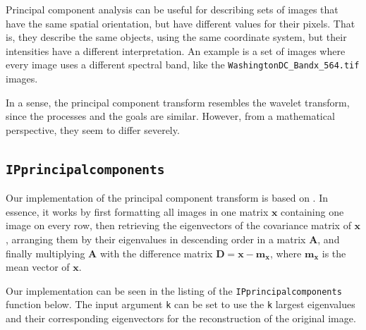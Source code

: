 Principal component analysis can be useful for describing sets of images that have the same spatial orientation, but have different values for their pixels.
That is, they describe the same objects, using the same coordinate system, but their intensities have a different interpretation.
An example is a set of images where every image uses a different spectral band, like the \texttt{WashingtonDC\_Bandx\_564.tif} images.

In a sense, the principal component transform resembles the wavelet transform, since the processes and the goals are similar.
However, from a mathematical perspective, they seem to differ severely.

\subsection{\texttt{IPprincipalcomponents}}
Our implementation of the principal component transform is based on \cite[Sec. 11.4]{gonzalez2002digital}.
In essence, it works by first formatting all images in one matrix \(\mathbf{x}\) containing one image on every row, then retrieving the eigenvectors of the covariance matrix of \(\mathbf{x}\), arranging them by their eigenvalues in descending order in a matrix \(\mathbf{A}\), and finally multiplying \(\mathbf{A}\) with the difference matrix \(\mathbf{D} = \mathbf{x} - \mathbf{m_x}\), where \(\mathbf{m_x}\) is the mean vector of \(\mathbf{x}\).

Our implementation can be seen in the listing of the \texttt{IPprincipalcomponents} function below.
The input argument \texttt{k} can be set to use the \texttt{k} largest eigenvalues and their corresponding eigenvectors for the reconstruction of the original image.

